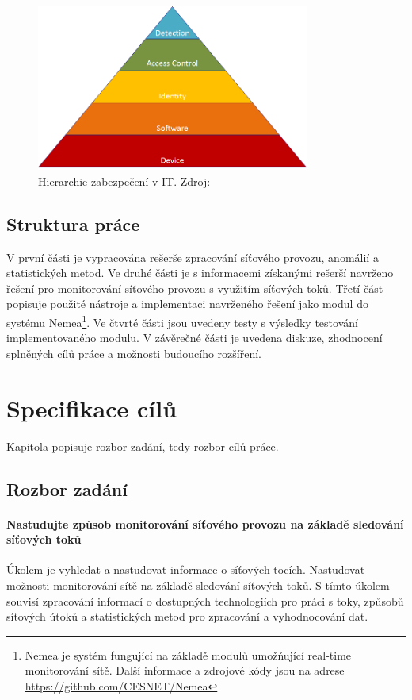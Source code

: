\documentclass[thesis=M,czech]{FITthesis}[2012/06/26]
\begin{document}
\begin{introduction}
	\begin{figure}[!htbp]\centering
		\includegraphics[width=0.8\textwidth]{security_hierarchy.png}
		\caption[Hierarchie zabezpečení v IT. Zdroj: \cite{networkhierarchy}]{Hierarchie zabezpečení v IT. Zdroj: \cite{networkhierarchy}}
		\label{img:security_hierarchy}
	\end{figure}
	
\section{Struktura práce}
V první části je vypracována rešerše zpracování síťového provozu, anomálií a statistických metod. Ve druhé části je s informacemi získanými rešerší navrženo řešení pro monitorování síťového provozu s využitím síťových toků. Třetí část popisuje použité nástroje a implementaci navrženého řešení jako modul do systému Nemea\footnote{Nemea je systém fungující na základě modulů umožňující real-time monitorování sítě. Další informace a zdrojové kódy jsou na adrese \url{https://github.com/CESNET/Nemea}}. Ve čtvrté části jsou uvedeny testy s výsledky testování implementovaného modulu. V závěrečné části je uvedena diskuze, zhodnocení splněných cílů práce a možnosti budoucího rozšíření.
\end{introduction}

\chapter{Specifikace cílů}
Kapitola popisuje rozbor zadání, tedy rozbor cílů práce. 
\section{Rozbor zadání}
\subsubsection*{Nastudujte způsob monitorování síťového provozu na základě sledování síťových toků}
Úkolem je vyhledat a nastudovat informace o síťových tocích. Nastudovat možnosti monitorování sítě na základě sledování síťových toků. S tímto úkolem souvisí zpracování informací o dostupných technologiích pro práci s toky, způsobů síťových útoků a statistických metod pro zpracování a vyhodnocování dat.  
\end{document}
